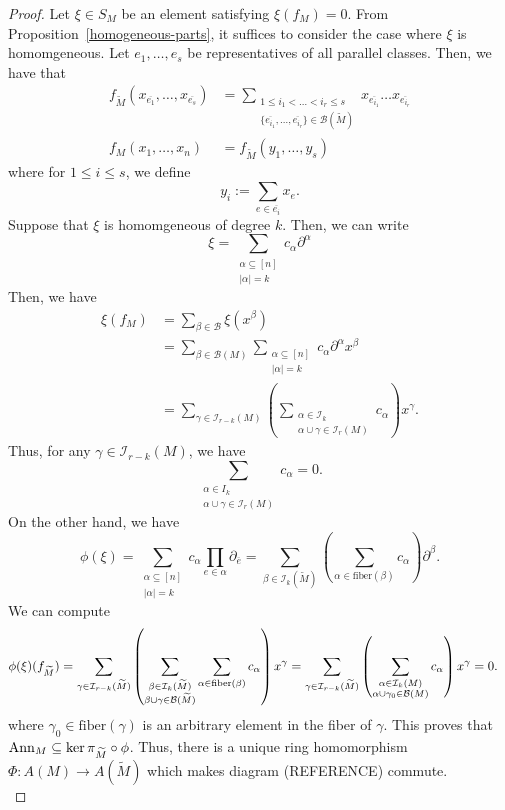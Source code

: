 \documentclass{puthesis-UG}
\begin{document}
\begin{proof}
Let $\xi \in S_M$ be an element satisfying $\xi (f_M) = 0$. From Proposition~\ref{homogeneous-parts}, it suffices to consider the case where $\xi$ is homomgeneous. Let $e_1, \ldots, e_s$ be representatives of all parallel classes. Then, we have that 
\begin{align*}
	f_{\widetilde{M}}(x_{\overline{e_1}}, \ldots, x_{\overline{e_s}}) & = \sum_{\substack{1 \leq i_1 < \ldots < i_r \leq s \\ \{\overline{e_{i_1}}, \ldots, \overline{e_{i_r}}\} \in \mathcal{B}(\widetilde{M})}} x_{\overline{e_{i_1}}} \ldots x_{\overline{e_{i_r}}} \\ 
	f_M(x_1, \ldots, x_n) & = f_{\widetilde{M}} \left ( y_1, \ldots, y_s \right )
\end{align*}
where for $1 \leq i \leq s$, we define 
\[
	y_i := \sum_{e \in \overline{e_i}} x_e.
\]
Suppose that $\xi$ is homomgeneous of degree $k$. Then, we can write 
\[
	\xi = \sum_{\substack{\alpha \subseteq [n] \\ |\alpha| = k}} c_\alpha \partial^\alpha
\]
Then, we have 
\begin{align*}
	\xi (f_M) & = \sum_{\beta \in \mathcal{B}} \xi (x^\beta)  \\
	& = \sum_{\beta \in \mathcal{B}(M)} \sum_{\substack{\alpha \subseteq [n] \\ |\alpha| = k}} c_\alpha \partial^\alpha x^\beta \\
	& = \sum_{\gamma \in \mathcal{I}_{r-k}(M)} \left ( \sum_{ \substack{\alpha \in \mathcal{I}_k \\ \alpha \cup \gamma \in \mathcal{I}_r(M)}} c_\alpha  \right ) x^\gamma. 
\end{align*}
Thus, for any $\gamma \in \mathcal{I}_{r-k}(M)$, we have 
\[
	\sum_{\substack{\alpha \in I_k \\ \alpha \cup \gamma \in \mathcal{I}_r(M)}} c_\alpha = 0.
\]
On the other hand, we have 
\[
	\phi (\xi) = \sum_{\substack{\alpha \subseteq [n] \\ |\alpha| = k}} c_\alpha \prod_{e \in \alpha} \partial_{\overline{e}} = \sum_{\beta \in \mathcal{I}_{k}(\widetilde{M})} \left ( \sum_{\alpha \in \text{fiber}(\beta)} c_\alpha \right ) \partial^\beta. 
\]
We can compute 
\begin{align*}
	\phi(\xi) (f_{\widetilde{M}}) & = \sum_{\gamma \in \mathcal{I}_{r-k}(\widetilde{M})} \left ( \sum_{\substack{\beta \in \mathcal{I}_k(\widetilde{M}) \\ \beta \cup \gamma \in \mathcal{B}(\widetilde{M})}} \sum_{\alpha \in \text{fiber}(\beta)} c_\alpha \right ) x^\gamma = \sum_{\gamma \in \mathcal{I}_{r-k}(\widetilde{M})} \left ( \sum_{\substack{\alpha \in \mathcal{I}_k(M) \\ \alpha \cup \gamma_0 \in \mathcal{B}(M)}} c_\alpha \right ) x^\gamma = 0.
\end{align*}
where $\gamma_0 \in \text{fiber}(\gamma)$ is an arbitrary element in the fiber of $\gamma$. This proves that $\operatorname{Ann}_M \subseteq \ker \pi_{\widetilde{M}} \circ \phi$. Thus, there is a unique ring homomorphism $\Phi : A(M) \to A(\widetilde{M})$ which makes diagram (REFERENCE) commute. \\


\end{proof}
\end{document}
